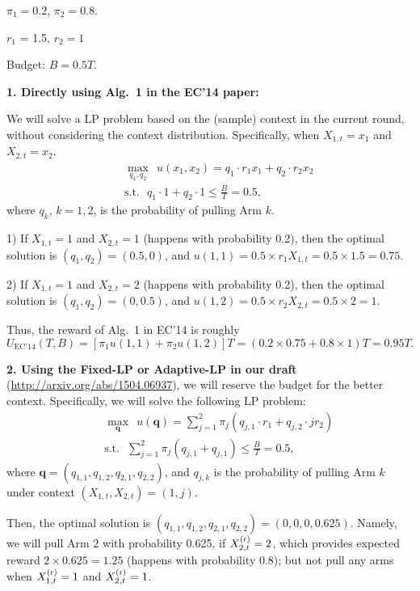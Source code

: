  $\pi_1 = 0.2$, $\pi_2 = 0.8$.

 $r_1$ = 1.5, $r_2 = 1$

Budget: $B = 0.5T$.

\textbf{1. Directly using Alg.~1 in the EC'14 paper:}

We will solve a LP problem based on the (sample) context in the current round, without considering the context distribution.  Specifically, when $X_{1,t} = x_1$ and $X_{2,t} = x_2$,
\begin{eqnarray}
&&\max_{q_1,q_2} ~~u(x_1,x_2) = q_1 \cdot r_1 x_1 + q_2 \cdot r_2 x_2  \nonumber \\
&&\text{s.t.}~~~ q_1 \cdot 1 + q_2  \cdot 1 \leq \frac{B}{T} = 0.5,\nonumber
\end{eqnarray}
where $q_k$, $k = 1,2$, is the probability of pulling Arm $k$.

1) If $X_{1,t} = 1$ and $X_{2,t} = 1$ (happens with probability 0.2), then the optimal solution is $(q_1, q_2) = (0.5,0)$, and $u(1,1) = 0.5 \times r_1 X_{1,t} = 0.5 \times 1.5 = 0.75$.

2) If $X_{1,t} = 1$ and $X_{2,t} = 2$ (happens with probability 0.2), then the optimal solution is $(q_1,q_2) = (0, 0.5)$, and $u(1,2) = 0.5 \times r_2 X_{2,t} = 0.5\times 2 = 1$.

Thus, the reward of Alg.~1 in EC'14 is roughly
\begin{equation}
U_{\text{EC'14}}(T,B) = [\pi_1 u(1,1) + \pi_2 u(1,2)]T = (0.2 \times 0.75 + 0.8 \times 1)T = 0.95T. \nonumber
\end{equation}

\textbf{2. Using the Fixed-LP or Adaptive-LP in our draft} (\url{http://arxiv.org/abs/1504.06937}), we will reserve the budget for the better context. Specifically, we will solve the following LP problem:
\begin{eqnarray}
&&\max_{\boldsymbol{q}} ~~u(\boldsymbol{q}) = \sum_{j=1}^2 \pi_j (q_{j,1} \cdot r_1 + q_{j,2} \cdot jr_2)  \nonumber \\
&&\text{s.t.}~~~  \sum_{j=1}^2 \pi_j (q_{j,1} + q_{j,1}) \leq \frac{B}{T} = 0.5,\nonumber
\end{eqnarray}
where $\boldsymbol{q} = (q_{1,1},q_{1,2}, q_{2,1},q_{2,2})$, and $q_{j,k}$ is the probability of pulling Arm $k$ under context $(X_{1,t},X_{2,t}) = (1,j)$.


Then, the optimal solution is $(q_{1,1},q_{1,2}, q_{2,1},q_{2,2}) = (0,0,0, 0.625)$. Namely, we will pull Arm 2 with probability 0.625, if $X^{\rm (r)}_{2,t} = 2$, which provides expected reward $2 \times 0.625 = 1.25$ (happens with probability 0.8); but not pull any arms when $X^{\rm (r)}_{1,t} = 1$ and $X^{\rm (r)}_{2,t} = 1$.

